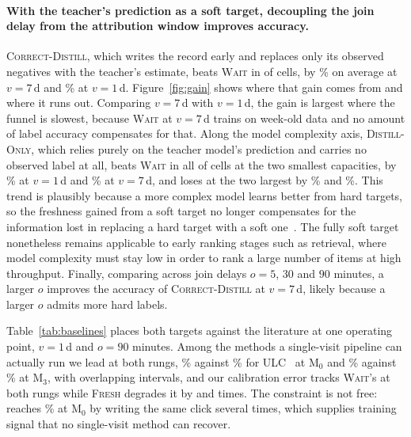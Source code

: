 \paragraph{With the teacher's prediction as a soft target, decoupling the join delay from the
attribution window improves accuracy.}
\textsc{Correct-Distill}, which writes the record early and replaces only its observed negatives
with the teacher's estimate, beats \textsc{Wait} in \cdBeatWait{} of \nCellsBoth{} cells, by
\cdSevenMeanAbs{}\% on average at $v=7$\,d and \cdOneMeanAbs{}\% at $v=1$\,d.
Figure~\ref{fig:gain} shows where that gain comes from and where it runs out. Comparing
$v=7$\,d with $v=1$\,d, the gain is largest where the funnel is slowest, because \textsc{Wait}
at $v=7$\,d trains on week-old data and no amount of label accuracy compensates for that. Along
the model complexity axis, \textsc{Distill-Only}, which relies purely on the teacher model's
prediction and carries no observed label at all, beats \textsc{Wait} in all \doSmallBeat{} of
\doSmallN{} cells at the two smallest capacities, by \doOneSmallAbs{}\% at $v=1$\,d and
\doSevenSmallAbs{}\% at $v=7$\,d, and loses at the two largest by \doOneLargeAbs{}\% and
\doSevenLargeAbs{}\%. This trend is plausibly because a more complex model learns better from
hard targets, so the freshness gained from a soft target no longer compensates for the
information lost in replacing a hard target with a soft one~\cite{menon2021statistical}. The
fully soft target nonetheless remains applicable to early ranking stages such as retrieval,
where model complexity must stay low in order to rank a large number of items at high
throughput. Finally, comparing across join delays $o=5$, $30$ and $90$ minutes, a larger $o$
improves the accuracy of \textsc{Correct-Distill} at $v=7$\,d, likely because a larger $o$
admits more hard labels.

Table~\ref{tab:baselines} places both targets against the literature at one operating point,
$v=1$\,d and $o=90$ minutes. Among the methods a single-visit pipeline can actually run we lead
at both rungs, \slSmallOur{}\% against \slSmallUlc{}\% for ULC~\cite{wang2023unbiased} at
$\mathrm{M}_0$ and \slLargeOur{}\% against \slLargeUlc{}\% at $\mathrm{M}_3$, with overlapping
intervals, and our calibration error tracks \textsc{Wait}'s at both rungs while \textsc{Fresh}
degrades it by \slSmallFreshCalRatio{} and \slLargeFreshCalRatio{} times. The
constraint is not free: \textsc{\slSmallBest} reaches \slSmallBestGain{}\% at $\mathrm{M}_0$ by
writing the same click several times, which supplies training signal that no single-visit
method can recover.
